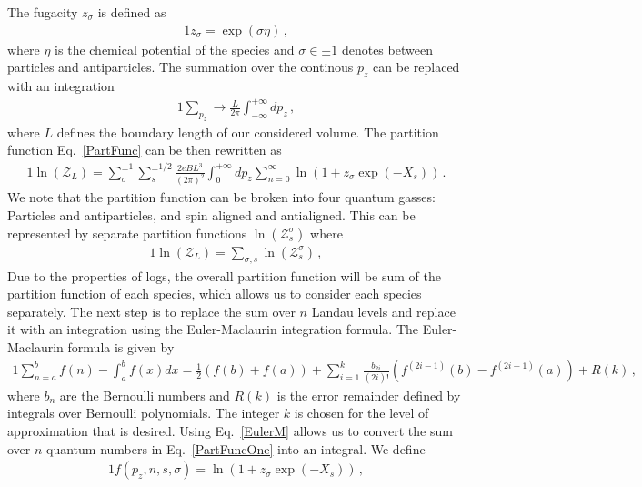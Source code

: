 \documentclass[
aps,
pra,
showpacs,
preprintnumbers,
amsmath,
amssymb,
footinbib
]{revtex4-2}
\newcommand*{\req}[1]{Eq.~{\eqref{#1}}}
\begin{document}
The fugacity $z_{\sigma}$ is defined as
\begin{alignat}{1}
    \label{Fugacity} z_{\sigma}=\exp\left(\sigma\eta\right)\,,
\end{alignat}
where $\eta$ is the chemical potential of the species and $\sigma\in\pm1$ denotes between particles and antiparticles. The summation over the continous $p_{z}$ can be replaced with an integration
\begin{alignat}{1}
    \label{pzInt} \sum_{p_{z}}\rightarrow\frac{L}{2\pi}\int^{+\infty}_{-\infty}dp_{z}\,,
\end{alignat}
where $L$ defines the boundary length of our considered volume. The partition function \req{PartFunc} can be then rewritten as
\begin{alignat}{1}
    \label{PartFuncOne} \ln\left(\mathcal{Z}_{L}\right)=\sum_{\sigma}^{\pm1}\sum_{s}^{\pm1/2}\frac{2eBL^{3}}{(2\pi)^{2}}\int^{+\infty}_{0}dp_{z}\sum_{n=0}^{\infty}\ln\left(1+z_{\sigma}\exp(-X_{s})\right)\,.
\end{alignat}
We note that the partition function can be broken into four quantum gasses: Particles and antiparticles, and spin aligned and antialigned. This can be represented by separate partition functions $\ln\left(\mathcal{Z}^{\sigma}_{s}\right)$ where
\begin{alignat}{1}
    \label{FourGasses} \ln\left(\mathcal{Z}_{L}\right)=\sum_{\sigma,s}\ln\left(\mathcal{Z}^{\sigma}_{s}\right)\,,
\end{alignat}
Due to the properties of logs, the overall partition function will be sum of the partition function of each species, which allows us to consider each species separately. The next step is to replace the sum over $n$ Landau levels and replace it with an integration using the Euler-Maclaurin integration formula. The Euler-Maclaurin formula is given by
\begin{alignat}{1}
    \label{EulerM} \sum^{b}_{n=a}f(n)-\int^{b}_{a}f(x)dx = \frac{1}{2}\left(f(b)+f(a)\right)+\sum_{i=1}^{k}\frac{b_{2i}}{(2i)!}\left(f^{(2i-1)}(b)-f^{(2i-1)}(a)\right)+R(k)\,,
\end{alignat}
where $b_{n}$ are the Bernoulli numbers and $R(k)$ is the error remainder defined by integrals over Bernoulli polynomials. The integer $k$ is chosen for the level of approximation that is desired. Using \req{EulerM} allows us to convert the sum over $n$ quantum numbers in \req{PartFuncOne} into an integral. We define
\begin{alignat}{1}
    \label{Func} f(p_{z},n,s,\sigma)=\ln\left(1+z_{\sigma}\exp(-X_{s})\right)\,,
\end{alignat}
\end{document}
